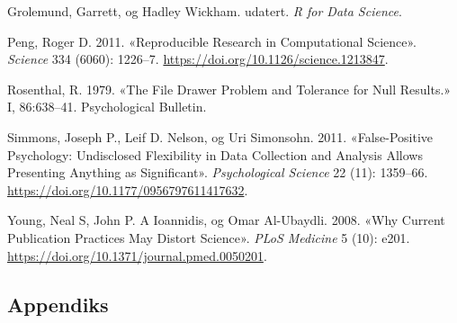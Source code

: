\documentclass[
  12pt,
  norsk,
]{article}
\begin{document}
\leavevmode\hypertarget{ref-grolemund}{}%
Grolemund, Garrett, og Hadley Wickham. udatert. \emph{R for Data
Science}.

\leavevmode\hypertarget{ref-peng2011}{}%
Peng, Roger D. 2011. «Reproducible Research in Computational Science».
\emph{Science} 334 (6060): 1226--7.
\url{https://doi.org/10.1126/science.1213847}.

\leavevmode\hypertarget{ref-rosenthal1979}{}%
Rosenthal, R. 1979. «The File Drawer Problem and Tolerance for Null
Results.» I, 86:638--41. Psychological Bulletin.

\leavevmode\hypertarget{ref-simmons2011}{}%
Simmons, Joseph P., Leif D. Nelson, og Uri Simonsohn. 2011.
«False-Positive Psychology: Undisclosed Flexibility in Data Collection
and Analysis Allows Presenting Anything as Significant».
\emph{Psychological Science} 22 (11): 1359--66.
\url{https://doi.org/10.1177/0956797611417632}.

\leavevmode\hypertarget{ref-young2008}{}%
Young, Neal S, John P. A Ioannidis, og Omar Al-Ubaydli. 2008. «Why
Current Publication Practices May Distort Science». \emph{PLoS Medicine}
5 (10): e201. \url{https://doi.org/10.1371/journal.pmed.0050201}.

\hypertarget{appendiks}{%
\subsection{Appendiks}\label{appendiks}}
\end{document}

